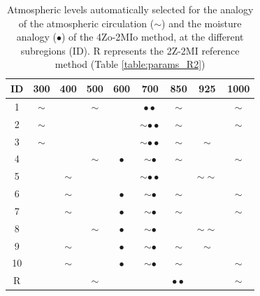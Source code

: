 \documentclass[review]{elsarticle}
\begin{document}
\begin{table}[t]
	\caption{Atmospheric levels automatically selected for the analogy of the atmospheric circulation ($\sim$) and the moisture analogy ($\bullet$) of the 4Zo-2MIo method, at the different subregions (ID). R represents the 2Z-2MI reference method (Table \ref{table:params_R2})}
	\footnotesize
	\begin{center}
		\begin{tabular}{ccccccccc}
			\hline ID & 300 & 400 & 500 & 600 & 700 & 850 & 925 & 1000 \\ 
			\hline 
			1  & $\sim$ &   & $\sim$ &   & $\bullet \bullet$  & $\sim$ &   & $\sim$ \\
			2  & $\sim$ &   &   &   & $\sim \bullet \bullet$ & $\sim$ &   & $\sim$ \\
			3  & $\sim$ &   &   &   & $\sim \bullet \bullet$ & $\sim$ & $\sim$ &   \\
			4  &   &   & $\sim$ & $\bullet$ & $\sim \bullet$ & $\sim$ &   & $\sim$ \\
			5  &   & $\sim$ &   &   & $\sim \bullet \bullet$ &   & $\sim \sim$ &   \\
			6  &   & $\sim$ &   & $\bullet$ & $\sim \bullet$ & $\sim$ &   & $\sim$ \\
			7  &   & $\sim$ &   & $\bullet$ & $\sim \bullet$ & $\sim$ &   & $\sim$ \\
			8  &   &   & $\sim$ & $\bullet$ & $\sim \bullet$ &   & $\sim \sim$ &   \\
			9  &   & $\sim$ &   & $\bullet$ & $\sim \bullet$ & $\sim$ & $\sim$ &   \\
			10 &   & $\sim$ &   & $\bullet$ & $\sim \bullet$ & $\sim$ &   & $\sim$ \\
			\hline 
			R &   &   & $\sim$ &   &   & $\bullet \bullet$ &   & $\sim$ \\
			\hline 
		\end{tabular} 
	\end{center}
	\label{table:levels_GA_4Zo_2MIo}
\end{table}
\end{document}
